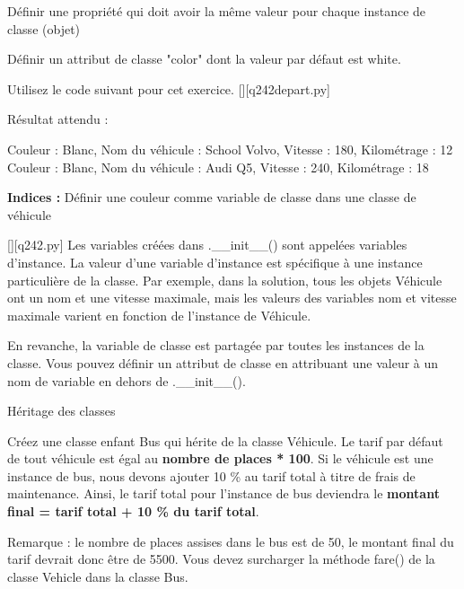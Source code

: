         \question
        Définir une propriété qui doit avoir la même valeur pour chaque instance de classe (objet)\newline

Définir un attribut de classe "color" dont la valeur par défaut est white.\newline

Utilisez le code suivant pour cet exercice.\newline
        \renewcommand{\nomfichier}{q242depart.py}
        \pythonfile{\chemincode \nomfichier}[][\nomfichier]		

Résultat attendu :\newline

Couleur : Blanc, Nom du véhicule : School Volvo, Vitesse : 180, Kilométrage : 12\newline
Couleur : Blanc, Nom du véhicule : Audi Q5, Vitesse : 240, Kilométrage : 18


        \par
        \textbf{Indices : }Définir une couleur comme variable de classe dans une classe de véhicule
        \renewcommand{\nomfichier}{q242.py}
        \begin{solution}
            \pythonfile{\chemincode \nomfichier}[][\nomfichier]
            Les variables créées dans .\_\_init\_\_() sont appelées variables d'instance. La valeur d'une variable d'instance est spécifique à une instance particulière de la classe. Par exemple, dans la solution, tous les objets Véhicule ont un nom et une vitesse maximale, mais les valeurs des variables nom et vitesse maximale varient en fonction de l'instance de Véhicule.
            
            En revanche, la variable de classe est partagée par toutes les instances de la classe. Vous pouvez définir un attribut de classe en attribuant une valeur à un nom de variable en dehors de .\_\_init\_\_().
        \end{solution}
        

        \question
        Héritage des classes

Créez une classe enfant Bus qui hérite de la classe Véhicule. Le tarif par défaut de tout véhicule est égal au \textbf{nombre de places * 100}. Si le véhicule est une instance de bus, nous devons ajouter 10 \% au tarif total à titre de frais de maintenance. Ainsi, le tarif total pour l'instance de bus deviendra le \textbf{montant final = tarif total + 10 \% du tarif total}.

Remarque : le nombre de places assises dans le bus est de 50, le montant final du tarif devrait donc être de 5500. Vous devez surcharger la méthode fare() de la classe Vehicle dans la classe Bus.

